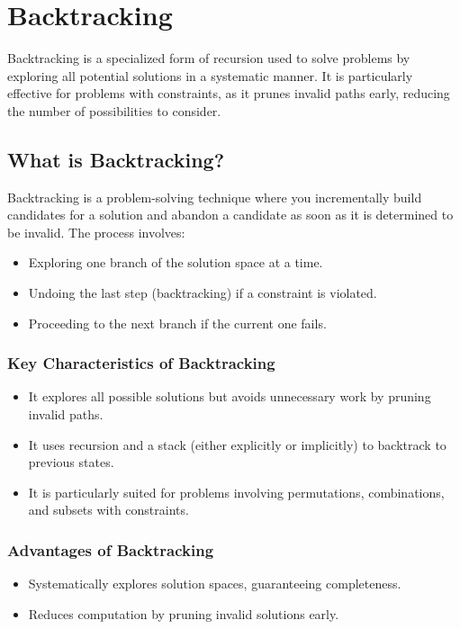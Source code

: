 
\chapter{Backtracking}
\label{chap:Backtracking}

Backtracking is a specialized form of recursion used to solve problems by exploring all potential solutions in a systematic manner. It is particularly effective for problems with constraints, as it prunes invalid paths early, reducing the number of possibilities to consider.

\section*{What is Backtracking?}
Backtracking is a problem-solving technique where you incrementally build candidates for a solution and abandon a candidate as soon as it is determined to be invalid. The process involves:
\begin{itemize}
    \item Exploring one branch of the solution space at a time.
    \item Undoing the last step (backtracking) if a constraint is violated.
    \item Proceeding to the next branch if the current one fails.
\end{itemize}

\subsection*{Key Characteristics of Backtracking}
\begin{itemize}
    \item It explores all possible solutions but avoids unnecessary work by pruning invalid paths.
    \item It uses recursion and a stack (either explicitly or implicitly) to backtrack to previous states.
    \item It is particularly suited for problems involving permutations, combinations, and subsets with constraints.
\end{itemize}

\subsection*{Advantages of Backtracking}
\begin{itemize}
    \item Systematically explores solution spaces, guaranteeing completeness.
    \item Reduces computation by pruning invalid solutions early.
\end{itemize}

